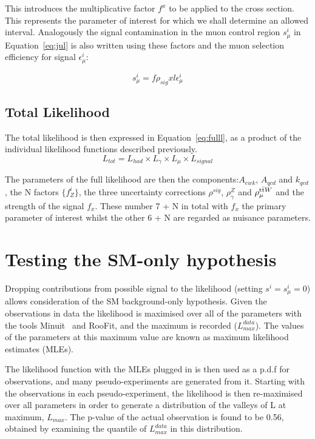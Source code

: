 This introduces the multiplicative factor $f^{x}$ to be applied to the cross section. This represents the parameter of interest for which we shall determine an allowed interval. Analogously the signal contamination in the muon control region $s^{i}_{\mu}$ in Equation~\ref{eq:jul} is also written using these factors and the muon selection efficiency for signal $\epsilon^{i}_{\mu}$:

\begin{equation}
s^{i}_{\mu} = f \rho_{sig} x l \epsilon^{i}_{\mu}
\label{eq:sig}
\end{equation}

\subsection{Total Likelihood}

The total likelihood is then expressed in Equation~\ref{eq:fulll}, as a product of the individual likelihood functions described previously.
\begin{equation}
L_{tot} = L_{had} \times L_{\gamma} \times L_{\mu} \times L_{signal}
\label{eq:fulll}
\end{equation}

The parameters of the full likelihood are then the \RaT components:$A_{ewk}$, $A_{qcd}$ and $k_{qcd}$, the N factors $\{f^{i}_{Z}\}$, the three uncertainty corrections $\rho^{sig}$, $\rho^{Z}_{\gamma}$ and $\rho^{\textrm{t}\bar{\textrm{t}} W}_{\mu}$ and the strength of the signal $f_{x}$. These number 7 + N in total with $f _{x}$ the primary parameter of interest whilst the other 6 + N are regarded as nuisance parameters.

\section{Testing the SM-only hypothesis}

Dropping contributions from possible signal to the likelihood (setting $s^{i} = s^{i}_{\mu} = 0$) allows consideration of the SM background-only hypothesis. Given the observations in data the likelihood is maximised over all of the parameters with the tools Minuit~\cite{minuit} and RooFit, and the maximum is recorded ($L^{data}_{max}$). The values of the parameters at this maximum value are known as maximum likelihood estimates (MLEs). 

The likelihood function with the MLEs plugged in is then used as a p.d.f for observations, and many pseudo-experiments are generated from it. Starting with the observations in each pseudo-experiment, the likelihood is then re-maximised over all parameters in order to generate a distribution of the valleys of L at maximum, $L_{max}$. The p-value of the actual observation is found to be 0.56, obtained by examining the quantile of $L^{data}_{max}$ in this distribution. 

